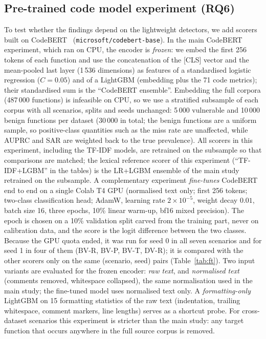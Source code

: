 \subsection{Pre-trained code model experiment (RQ6)}\label{sec:design_cb}
To test whether the findings depend on the lightweight detectors, we add scorers built on CodeBERT~\cite{feng2020codebert} (\texttt{microsoft/codebert-base}). In the main CodeBERT experiment, which ran on CPU, the encoder is \emph{frozen}: we embed the first 256 tokens of each function and use the concatenation of the [CLS] vector and the mean-pooled last layer (1\,536 dimensions) as features of a standardised logistic regression ($C{=}0.05$) and of a LightGBM (embedding plus the 71 code metrics); their standardised sum is the ``CodeBERT ensemble''. Embedding the full corpora (487\,000 functions) is infeasible on CPU, so we use a stratified subsample of each corpus with all scenarios, splits and seeds unchanged: 5\,000 vulnerable and 10\,000 benign functions per dataset (30\,000 in total; the benign functions are a uniform sample, so positive-class quantities such as the miss rate are unaffected, while AUPRC and SAR are weighted back to the true prevalence). All scorers in this experiment, including the TF-IDF models, are retrained on the subsample so that comparisons are matched; the lexical reference scorer of this experiment (``TF-IDF+LGBM'' in the tables) is the LR+LGBM ensemble of the main study retrained on the subsample.
A complementary experiment \emph{fine-tunes} CodeBERT end to end on a single Colab T4 GPU (normalised text only; first 256 tokens; two-class classification head; AdamW, learning rate $2\times10^{-5}$, weight decay $0.01$, batch size 16, three epochs, 10\% linear warm-up, bf16 mixed precision). The epoch is chosen on a 10\% validation split carved from the training part, never on calibration data, and the score is the logit difference between the two classes. Because the GPU quota ended, it was run for seed 0 in all seven scenarios and for seed 1 in four of them (BV-R, BV-P, BV-T, DV-R); it is compared with the other scorers only on the same (scenario, seed) pairs (Table~\ref{tab:ft}).
Two input variants are evaluated for the frozen encoder: \emph{raw text}, and \emph{normalised text} (comments removed, whitespace collapsed), the same normalisation used in the main study; the fine-tuned model uses normalised text only. A \emph{formatting-only} LightGBM on 15 formatting statistics of the raw text (indentation, trailing whitespace, comment markers, line lengths) serves as a shortcut probe. For cross-dataset scenarios this experiment is stricter than the main study: any target function that occurs anywhere in the full source corpus is removed.

